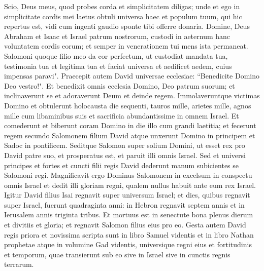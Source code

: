 \begin{biblechapter}
\verse Scio, Deus meus, quod probes corda et simplicitatem diligas; unde et ego in simplicitate cordis mei laetus obtuli universa haec et populum tuum, qui hic repertus est, vidi cum ingenti gaudio sponte tibi offerre donaria. 
\verse Domine, Deus Abraham et Isaac et Israel patrum nostrorum, custodi in aeternum hanc voluntatem cordis eorum; et semper in venerationem tui mens ista permaneat. 
\verse Salomoni quoque filio meo da cor perfectum, ut custodiat mandata tua, testimonia tua et legitima tua et faciat universa et aedificet aedem, cuius impensas paravi". 
\verse Praecepit autem David universae ecclesiae: “Benedicite Domino Deo vestro!". Et benedixit omnis ecclesia Domino, Deo patrum suorum; et inclinaverunt se et adoraverunt Deum et deinde regem. 
\verse Immolaveruntque victimas Domino et obtulerunt holocausta die sequenti, tauros mille, arietes mille, agnos mille cum libaminibus suis et sacrificia abundantissime in omnem Israel. 
\verse Et comederunt et biberunt coram Domino in die illo cum grandi laetitia; et fecerunt regem secundo Salomonem filium David atque unxerunt Domino in principem et Sadoc in pontificem. 
\verse Seditque Salomon super solium Domini, ut esset rex pro David patre suo, et prosperatus est, et paruit illi omnis Israel. 
\verse Sed et universi principes et fortes et cuncti filii regis David dederunt manum subicientes se Salomoni regi. 
\verse Magnificavit ergo Dominus Salomonem in excelsum in conspectu omnis Israel et dedit illi gloriam regni, qualem nullus habuit ante eum rex Israel. 
\verse Igitur David filius Isai regnavit super universum Israel; 
\verse et dies, quibus regnavit super Israel, fuerunt quadraginta anni: in Hebron regnavit septem annis et in Ierusalem annis triginta tribus. 
\verse Et mortuus est in senectute bona plenus dierum et divitiis et gloria; et regnavit Salomon filius eius pro eo. 
\verse Gesta autem David regis priora et novissima scripta sunt in libro Samuel videntis et in libro Nathan prophetae atque in volumine Gad videntis, 
\verse universique regni eius et fortitudinis et temporum, quae transierunt sub eo sive in Israel sive in cunctis regnis terrarum.
\end{biblechapter}
